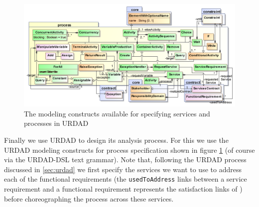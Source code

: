 \begin{figure}[Htbp]
  \centering
  \includegraphics{process}
  \caption{The modeling constructs available for specifying services and processes in URDAD}
  \label{fig:processModule}
\end{figure}

Finally we use URDAD to design its analysis process. For this we use the URDAD modeling constructs for process specification shown in figure \ref{fig:processModule} (of course via the URDAD-DSL text grammar). Note that, following the URDAD process discussed in \ref{sec:urdad} we first specify the services we want to use to address each of the functional requirements (the \verb+usedToAddress+ links between a service requirement and a functional requirement represents the satisfaction links of \cite{ramesh_toward_2001}) before choreographing the process across these services. 

